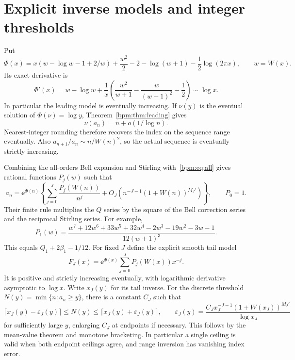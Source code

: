 \documentclass[11pt,a4paper]{article}
\theoremstyle{remark}\newtheorem{remark}[theorem]{Remark}%
\begin{document}
\section{Explicit inverse models and integer thresholds}\label{bpm:sec:inverse}
Put
\begin{equation}\label{bpm:eq:Phi}
 \Phi(x)=x(w-\log w-1+2/w)+\frac{w^2}2-2
          -\log(w+1)-\frac12\log(2\pi x),\qquad w=W(x).
\end{equation}
Its exact derivative is
\begin{equation}\label{bpm:eq:Phiderivative}
 \Phi'(x)=w-\log w+\frac1x
 \left(\frac{w^2}{w+1}-\frac{w}{(w+1)^2}-\frac12\right)
 \sim\log x.
\end{equation}
In particular the leading model is eventually increasing. If $\nu(y)$ is the eventual solution of $\Phi(\nu)=\log y$, Theorem~\ref{bpm:thm:leading} gives
\[
 \nu(a_n)=n+o(1/\log n).
\]
Nearest-integer rounding therefore recovers the index on the sequence range eventually. Also $a_{n+1}/a_n\sim n/W(n)^2$, so the actual sequence is eventually strictly increasing.

Combining the all-orders Bell expansion and Stirling with~\eqref{bpm:eq:all} gives rational functions $P_j(w)$ such that
\begingroup\renewcommand{\theHequation}{28a}%
\begin{equation}\tag{28a}\label{bpm:eq:Pall}%
 a_n=\ee^{\Phi(n)}\left\{\sum_{j=0}^J\frac{P_j(W(n))}{n^j}
             +O_J(n^{-J-1}(1+W(n))^{M_J'})\right\},\qquad P_0=1.
\end{equation}\endgroup
Their finite rule multiplies the $Q$ series by the square of the Bell correction series and the reciprocal Stirling series. For example,
\begin{equation}\label{bpm:eq:P1}
 P_1(w)=\frac{w^7+12w^6+33w^5+32w^4-2w^3-19w^2-3w-1}
 {12(w+1)^3}.
\end{equation}
This equals $Q_1+2\beta_1-1/12$.
For fixed $J$ define the explicit smooth tail model
\[
 F_J(x)=\ee^{\Phi(x)}\sum_{j=0}^J P_j(W(x))x^{-j}.
\]
It is positive and strictly increasing eventually, with logarithmic derivative asymptotic to $\log x$. Write $x_J(y)$ for its tail inverse. For the discrete threshold $N(y)=\min\{n:a_n\ge y\}$, there is a constant $C_J$ such that
\begin{equation}\label{bpm:eq:ceil}
 \lceil x_J(y)-\varepsilon_J(y)\rceil\le N(y)
 \le\lceil x_J(y)+\varepsilon_J(y)\rceil,\qquad
 \varepsilon_J(y)=\frac{C_J x_J^{-J-1}(1+W(x_J))^{M_J'}}{\log x_J}
\end{equation}
for sufficiently large $y$, enlarging $C_J$ at endpoints if necessary. This follows by the mean-value theorem and monotone bracketing. In particular a single ceiling is valid when both endpoint ceilings agree, and range inversion has vanishing index error.
\end{document}
